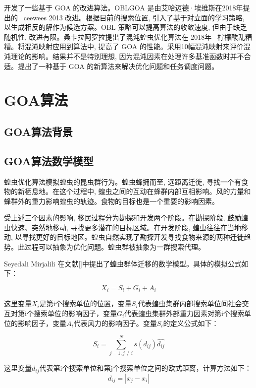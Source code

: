 开发了一些基于 GOA 的改进算法。OBLGOA 是由艾哈迈德·埃维斯在2018年提出的 \ ceewees 2013 改进。根据目前的搜索位置, 引入了基于对立面的学习策略, 以生成相反的解作为候选方案。OBL 策略可以提高算法的收敛速度, 但由于缺乏随机性, 改进有限。桑卡拉阿罗拉提出了混沌蝗虫优化算法在 2018年 \ 柠檬酸乱糟糟。将混沌映射应用到算法中, 提高了 GOA 的性能。采用10幅混沌映射来评价混沌理论的影响。结果并不是特别理想, 因为混沌因素在处理许多基准函数时并不合适。提出了一种基于 GOA 的新算法来解决优化问题和任务调度问题。

\section{GOA算法}\label{sec:task_scheduling_GOA}
\subsection{GOA算法背景}
\subsection{GOA算法数学模型}
蝗虫优化算法模拟蝗虫的昆虫群行为。蝗虫蜂拥而至, 远距离迁徙, 寻找一个有食物的新栖息地。在这个过程中, 蝗虫之间的互动在蜂群内部互相影响。风的力量和蜂群外的重力影响蝗虫的轨迹。食物的目标也是一个重要的影响因素。

受上述三个因素的影响, 移民过程分为勘探和开发两个阶段。在勘探阶段, 鼓励蝗虫快速、突然地移动, 寻找更多潜在的目标区域。在开发阶段, 蝗虫往往在当地移动, 以寻找更好的目标地区。蝗虫自然实现了勘探开发寻找食物来源的两种迁徙趋势。此过程可以抽象为优化问题。蝗虫群被抽象为一群搜索代理。

Seyedali Mirjalili 在文献[]中提出了蝗虫群体迁移的数学模型。具体的模拟公式如下：

\begin{equation}
    X_i = S_i + G_i + A_i 
\end{equation}

这里变量$X_i$是第i个搜索单位的位置，变量$S_i$代表蝗虫集群内部搜索单位间社会交互对第i个搜索单位的影响因子，变量$G_i$代表蝗虫集群外部重力因素对第i个搜索单位的影响因子，变量$A_i$代表风力的影响因子。变量$S_i$的定义公式如下：

\begin{equation}
    S_i = \sum_{j=1, j\neq{i}}^N s(d_{ij})\widehat{d_{ij}}
\end{equation}

这里变量$d_{ij}$代表第i个搜索单位和第j个搜索单位之间的欧式距离，计算方法如下：
\begin{equation}
    d_{ij}=|x_j-x_i|
\end{equation}

